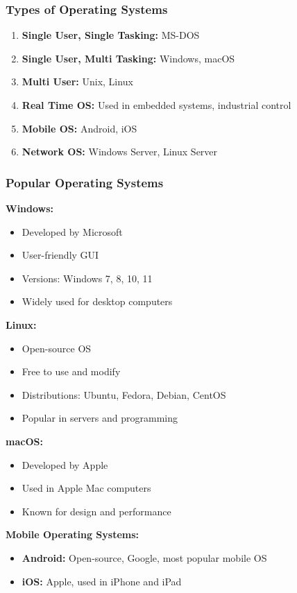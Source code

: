 \documentclass[12pt,a4paper]{article}
\begin{document}
\subsubsection{Types of Operating Systems}

\begin{enumerate}
    \item \textbf{Single User, Single Tasking:} MS-DOS
    \item \textbf{Single User, Multi Tasking:} Windows, macOS
    \item \textbf{Multi User:} Unix, Linux
    \item \textbf{Real Time OS:} Used in embedded systems, industrial control
    \item \textbf{Mobile OS:} Android, iOS
    \item \textbf{Network OS:} Windows Server, Linux Server
\end{enumerate}

\subsubsection{Popular Operating Systems}

\textbf{Windows:}
\begin{itemize}
    \item Developed by Microsoft
    \item User-friendly GUI
    \item Versions: Windows 7, 8, 10, 11
    \item Widely used for desktop computers
\end{itemize}

\textbf{Linux:}
\begin{itemize}
    \item Open-source OS
    \item Free to use and modify
    \item Distributions: Ubuntu, Fedora, Debian, CentOS
    \item Popular in servers and programming
\end{itemize}

\textbf{macOS:}
\begin{itemize}
    \item Developed by Apple
    \item Used in Apple Mac computers
    \item Known for design and performance
\end{itemize}

\textbf{Mobile Operating Systems:}
\begin{itemize}
    \item \textbf{Android:} Open-source, Google, most popular mobile OS
    \item \textbf{iOS:} Apple, used in iPhone and iPad
\end{itemize}
\end{document}
